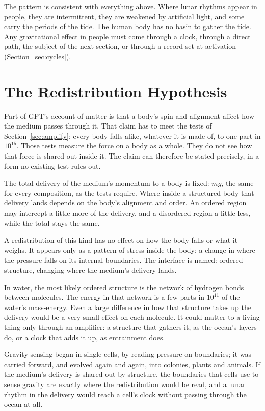 \documentclass[11pt,a4paper]{article}
\begin{document}
The pattern is consistent with everything above. Where lunar rhythms appear in people, they are intermittent, they are weakened by artificial light, and some carry the periods of the tide. The human body has no basin to gather the tide. Any gravitational effect in people must come through a clock, through a direct path, the subject of the next section, or through a record set at activation (Section~\ref{sec:cycles}).

\section{The Redistribution Hypothesis}
\label{sec:redistribution}

Part of GPT's account of matter is that a body's spin and alignment affect how the medium passes through it. That claim has to meet the tests of Section~\ref{sec:amplify}: every body falls alike, whatever it is made of, to one part in $10^{15}$. Those tests measure the force on a body as a whole. They do not see how that force is shared out inside it. The claim can therefore be stated precisely, in a form no existing test rules out.

\begin{hypbar}
The total delivery of the medium's momentum to a body is fixed: $mg$, the same for every composition, as the tests require. Where inside a structured body that delivery lands depends on the body's alignment and order. An ordered region may intercept a little more of the delivery, and a disordered region a little less, while the total stays the same.

A redistribution of this kind has no effect on how the body falls or what it weighs. It appears only as a pattern of stress inside the body: a change in where the pressure falls on its internal boundaries. The interface is named: ordered structure, changing where the medium's delivery lands.
\end{hypbar}

 In water, the most likely ordered structure is the network of hydrogen bonds between molecules. The energy in that network is a few parts in $10^{11}$ of the water's mass-energy. Even a large difference in how that structure takes up the delivery would be a very small effect on each molecule. It could matter to a living thing only through an amplifier: a structure that gathers it, as the ocean's layers do, or a clock that adds it up, as entrainment does.

 Gravity sensing began in single cells, by reading pressure on boundaries; it was carried forward, and evolved again and again, into colonies, plants and animals. If the medium's delivery is shared out by structure, the boundaries that cells use to sense gravity are exactly where the redistribution would be read, and a lunar rhythm in the delivery would reach a cell's clock without passing through the ocean at all.
\end{document}
